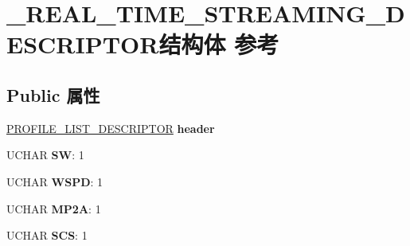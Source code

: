 \hypertarget{struct___r_e_a_l___t_i_m_e___s_t_r_e_a_m_i_n_g___d_e_s_c_r_i_p_t_o_r}{}\section{\+\_\+\+R\+E\+A\+L\+\_\+\+T\+I\+M\+E\+\_\+\+S\+T\+R\+E\+A\+M\+I\+N\+G\+\_\+\+D\+E\+S\+C\+R\+I\+P\+T\+O\+R结构体 参考}
\label{struct___r_e_a_l___t_i_m_e___s_t_r_e_a_m_i_n_g___d_e_s_c_r_i_p_t_o_r}
\subsection*{Public 属性}
\begin{DoxyCompactItemize}
\item 
\mbox{\label{struct___r_e_a_l___t_i_m_e___s_t_r_e_a_m_i_n_g___d_e_s_c_r_i_p_t_o_r_a9d6b995a4a734485ba691a6ff26029ac}} 
\hyperlink{struct___p_r_o_f_i_l_e___l_i_s_t___d_e_s_c_r_i_p_t_o_r}{P\+R\+O\+F\+I\+L\+E\+\_\+\+L\+I\+S\+T\+\_\+\+D\+E\+S\+C\+R\+I\+P\+T\+OR} {\bfseries header}
\item 
\mbox{\label{struct___r_e_a_l___t_i_m_e___s_t_r_e_a_m_i_n_g___d_e_s_c_r_i_p_t_o_r_a969e1601ee02f85b35b59f18bf4ec4ae}} 
U\+C\+H\+AR {\bfseries SW}\+: 1
\item 
\mbox{\label{struct___r_e_a_l___t_i_m_e___s_t_r_e_a_m_i_n_g___d_e_s_c_r_i_p_t_o_r_ac8e6f1321cf38a047169a40acbd3a8fe}} 
U\+C\+H\+AR {\bfseries W\+S\+PD}\+: 1
\item 
\mbox{\label{struct___r_e_a_l___t_i_m_e___s_t_r_e_a_m_i_n_g___d_e_s_c_r_i_p_t_o_r_ad9352a6b85f96ae022cf57b351155050}} 
U\+C\+H\+AR {\bfseries M\+P2A}\+: 1
\item 
\mbox{\label{struct___r_e_a_l___t_i_m_e___s_t_r_e_a_m_i_n_g___d_e_s_c_r_i_p_t_o_r_ad4ee3a2771a744493a360f725ae0d75f}} 
U\+C\+H\+AR {\bfseries S\+CS}\+: 1

\end{DoxyCompactItemize}
